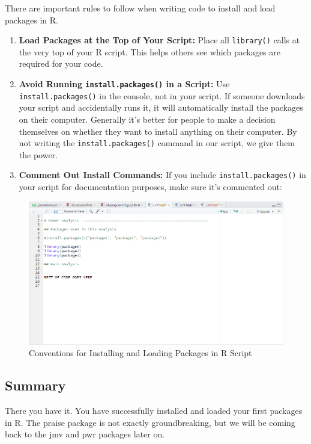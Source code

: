 \documentclass[
]{book}
\begin{document}
There are important rules to follow when writing code to install and load packages in R.

\begin{enumerate}
\def\labelenumi{\arabic{enumi}.}
\item
  \textbf{Load Packages at the Top of Your Script:} Place all \texttt{library()} calls at the very top of your R script. This helps others see which packages are required for your code.
\item
  \textbf{Avoid Running \texttt{install.packages()} in a Script:} Use \texttt{install.packages()} in the console, not in your script. If someone downloads your script and accidentally runs it, it will automatically install the packages on their computer. Generally it's better for people to make a decision themselves on whether they want to install anything on their computer. By not writing the \texttt{install.packages()} command in our script, we give them the power.
\item
  \textbf{Comment Out Install Commands:} If you include \texttt{install.packages()} in your script for documentation purposes, make sure it's commented out:
\end{enumerate}

\begin{figure}
\centering
\includegraphics{img/04-packages-convention.png}
\caption{\label{fig:unnamed-chunk-140}Conventions for Installing and Loading Packages in R Script}
\end{figure}

\subsection{Summary}\label{summary-2}

There you have it. You have successfully installed and loaded your first packages in R. The praise package is not exactly groundbreaking, but we will be coming back to the jmv and pwr packages later on.
\end{document}
